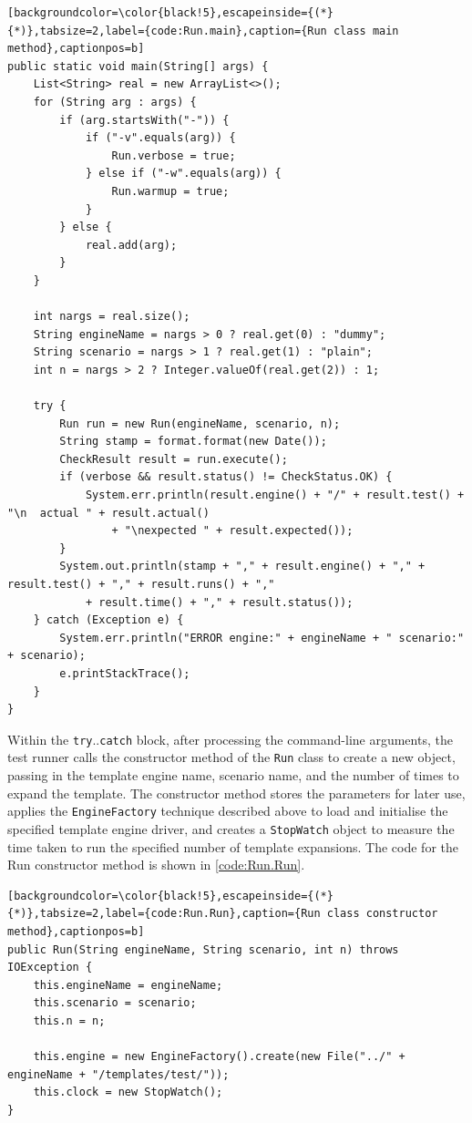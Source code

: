 \begin{lstlisting}[backgroundcolor=\color{black!5},escapeinside={(*}{*)},tabsize=2,label={code:Run.main},caption={Run class main method},captionpos=b]
public static void main(String[] args) {
    List<String> real = new ArrayList<>();
    for (String arg : args) {
        if (arg.startsWith("-")) {
            if ("-v".equals(arg)) {
                Run.verbose = true;
            } else if ("-w".equals(arg)) {
                Run.warmup = true;
            }
        } else {
            real.add(arg);
        }
    }

    int nargs = real.size();
    String engineName = nargs > 0 ? real.get(0) : "dummy";
    String scenario = nargs > 1 ? real.get(1) : "plain";
    int n = nargs > 2 ? Integer.valueOf(real.get(2)) : 1;

    try {
        Run run = new Run(engineName, scenario, n);
        String stamp = format.format(new Date());
        CheckResult result = run.execute();
        if (verbose && result.status() != CheckStatus.OK) {
            System.err.println(result.engine() + "/" + result.test() + "\n  actual " + result.actual()
                + "\nexpected " + result.expected());
        }
        System.out.println(stamp + "," + result.engine() + "," + result.test() + "," + result.runs() + ","
            + result.time() + "," + result.status());
    } catch (Exception e) {
        System.err.println("ERROR engine:" + engineName + " scenario:" + scenario);
        e.printStackTrace();
    }
}
\end{lstlisting}

Within the \verb!try!..\verb!catch! block, after processing the command-line arguments, the test runner calls the constructor method of the \verb!Run! class to create a new object, passing in the template engine name, scenario name, and the number of times to expand the template. The constructor method stores the parameters for later use, applies the \verb!EngineFactory! technique described above to load and initialise the specified template engine driver, and creates a \verb!StopWatch! object to measure the time taken to run the specified number of template expansions. The code for the Run constructor method is shown in \autoref{code:Run.Run}.

\begin{lstlisting}[backgroundcolor=\color{black!5},escapeinside={(*}{*)},tabsize=2,label={code:Run.Run},caption={Run class constructor method},captionpos=b]
public Run(String engineName, String scenario, int n) throws IOException {
    this.engineName = engineName;
    this.scenario = scenario;
    this.n = n;

    this.engine = new EngineFactory().create(new File("../" + engineName + "/templates/test/"));
    this.clock = new StopWatch();
}
\end{lstlisting}

